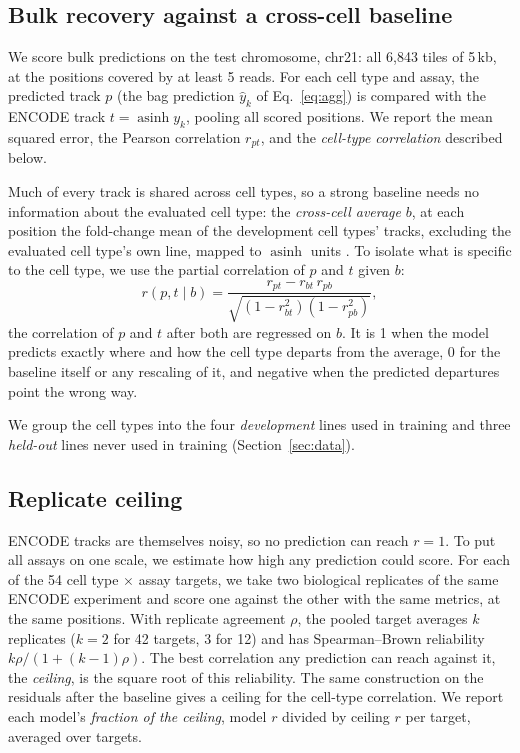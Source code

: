\documentclass[acmtog,nonacm]{acmart}   %
\begin{document}
\subsection{Bulk recovery against a cross-cell baseline}
\label{sec:eval-bulk}

We score bulk predictions on the test chromosome, chr21: all 6,843 tiles of 5\,kb, at the positions covered by at
least 5 reads. For each cell type and assay, the predicted track $p$ (the bag prediction $\hat y_k$ of
Eq.~\ref{eq:agg}) is compared with the ENCODE track $t=\operatorname{asinh}y_k$, pooling all scored positions. We
report the mean squared error, the Pearson correlation $r_{pt}$, and the \emph{cell-type correlation} described
below.

Much of every track is shared across cell types, so a strong baseline needs no information about the evaluated
cell type: the \emph{cross-cell average} $b$, at each position the fold-change mean of the development cell types'
tracks, excluding the evaluated cell type's own line, mapped to $\operatorname{asinh}$ units
\citep{Schreiber20Pitfall}. To isolate what is specific to the cell type, we use the partial correlation of $p$ and
$t$ given $b$:
\begin{equation}
r(p,t\mid b)=\frac{r_{pt}-r_{bt}\,r_{pb}}{\sqrt{(1-r_{bt}^2)(1-r_{pb}^2)}},
\label{eq:ctr}
\end{equation}
the correlation of $p$ and $t$ after both are regressed on $b$. It is 1 when the model predicts exactly where and
how the cell type departs from the average, 0 for the baseline itself or any rescaling of it, and negative when the
predicted departures point the wrong way.

We group the cell types into the four \emph{development} lines used in training and three \emph{held-out} lines
never used in training (Section~\ref{sec:data}).

\subsection{Replicate ceiling}
\label{sec:eval-ceiling}

ENCODE tracks are themselves noisy, so no prediction can reach $r=1$. To put all assays on one scale, we estimate
how high any prediction could score. For each of the 54 cell type $\times$ assay targets, we take two biological
replicates of the same ENCODE experiment and score one against the other with the same metrics, at the same
positions. With replicate agreement $\rho$, the pooled target averages $k$ replicates ($k=2$ for 42 targets, 3 for
12) and has Spearman--Brown reliability $k\rho/(1+(k-1)\rho)$. The best correlation any prediction can reach against
it, the \emph{ceiling}, is the square root of this reliability. The same construction on the residuals after the
baseline gives a ceiling for the cell-type correlation. We report each model's \emph{fraction of the ceiling}, model
$r$ divided by ceiling $r$ per target, averaged over targets.
\end{document}
